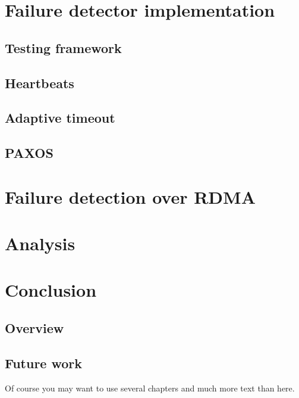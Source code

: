 \documentclass[bsc,frontabs,twoside,singlespacing,parskip,deptreport,hidel]{infthesis}     %
\begin{document}
\chapter{Failure detector implementation}
\label{chap:failure_detector_impl}

\section{Testing framework}
\section{Heartbeats}
\section{Adaptive timeout}
\section{PAXOS}

\chapter{Failure detection over RDMA}

\chapter{Analysis}

\chapter{Conclusion}
\section{Overview}
\section{Future work}


Of course
you may want to use several chapters and much more text than here.



\end{document}
